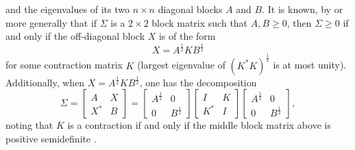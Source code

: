 \documentclass[notitlepage, 10pt]{article}
\begin{document}
and the eigenvalues of its two $n\times n$ diagonal blocks $A$ and $B$.
It is known, by \cite[Theorem 7.7.9]{horn2012matrix} or more generally \cite[Theorem 5.11]{moslehian2019positivity} that if $\Sigma$ is a $2\times 2$ block matrix such that $A,B \geq 0$, then $\Sigma \geq 0$ if and only if the off-diagonal block $X$ is of the form
\begin{equation}
    X = A^{\frac{1}{2}} K B^{\frac{1}{2}}
\end{equation}
for some contraction matrix $K$ (largest eigenvalue of $(K^{*}K)^{\frac{1}{2}}$ is at most unity).
Additionally, when $X = A^{\frac{1}{2}} K B^{\frac{1}{2}}$, one has the decomposition
\begin{equation}
    \Sigma = \begin{bmatrix}
        A & X \\
        X^{*} & B
    \end{bmatrix} 
    =
    \begin{bmatrix}
        A^{\frac{1}{2}} & 0 \\
        0 & B^{\frac{1}{2}}
    \end{bmatrix}
    \begin{bmatrix}
        I & K \\
        K^{*} & I
    \end{bmatrix}
    \begin{bmatrix}
        A^{\frac{1}{2}} & 0 \\
        0 & B^{\frac{1}{2}}
    \end{bmatrix},
\end{equation}
noting that $K$ is a contraction if and only if the middle block matrix above is positive semidefinite \cite[Lemma 5.10]{moslehian2019positivity}.
\end{document}
